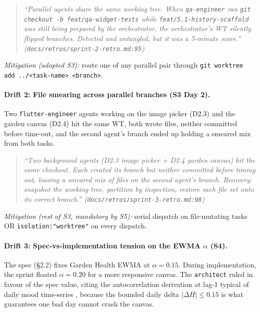 \documentclass[11pt,a4paper]{article}
\begin{document}
\begin{quote}\itshape
``Parallel agents share the same working tree. When \texttt{qa-engineer}
ran \texttt{git checkout -b feat/qa-widget-tests} while
\texttt{feat/5.1-history-scaffold} was still being prepared by the
orchestrator, the orchestrator's WT silently flipped branches.
Detected and untangled, but it was a 5-minute scare.''
(\texttt{docs/retros/sprint-2-retro.md:95})
\end{quote}

\textit{Mitigation (adopted S3):} route one of any parallel pair through
\texttt{git worktree add ../<task-name> <branch>}.

\paragraph{Drift 2: File smearing across parallel branches (S3 Day 2).}
Two \texttt{flutter-engineer} agents working on the image picker (D2.3)
and the garden canvas (D2.4) hit the same WT, both wrote files, neither
committed before time-out, and the second agent's branch ended up
holding a smeared mix from both tasks.

\begin{quote}\itshape
``Two background agents (D2.3 image picker + D2.4 garden canvas) hit
the same checkout. Each created its branch but neither committed before
timing out, leaving a smeared mix of files on the second agent's branch.
Recovery: snapshot the working tree, partition by inspection, restore
each file set onto its correct branch.''
(\texttt{docs/retros/sprint-3-retro.md:98})
\end{quote}

\textit{Mitigation (rest of S3, mandatory by S5):} serial dispatch on
file-mutating tasks OR \texttt{isolation:"worktree"} on every dispatch.

\paragraph{Drift 3: Spec-vs-implementation tension on the EWMA $\alpha$
(S4).} The spec (\S 2.2) fixes Garden Health EWMA at $\alpha=0.15$. During
implementation, the sprint floated $\alpha=0.20$ for a more responsive
canvas. The \texttt{architect} ruled in favour of the spec value, citing
the autocorrelation derivation at lag-1 typical of daily mood time-series
\cite{smit2022ewma}, because the bounded daily delta
$|\Delta H| \le 0.15$ is what guarantees one bad day cannot crash the
canvas.
\end{document}
